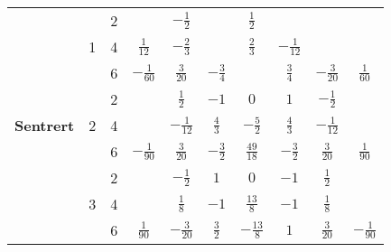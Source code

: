 \begin{table}[H]
\begin{tabular}{|c|c|c|c|c|c|c|c|c|c|}
        \multirow{12}{*}{\textbf{\footnotesize{Sentrert}}}
                                                          & \multirow{3}{*}{1}           & 2                           &                  & $-\frac{1}{2}$   &                 & $\frac{1}{2}$    &                   &                    &                  \\ \cline{3-10}
                                                          &                              & 4                           & $\frac{1}{12}$   & $-\frac{2}{3}$   &                 & $\frac{2}{3}$    & $-\frac{1}{12}$   &                    &                  \\ \cline{3-10}
                                                          &                              & 6                           & $-\frac{1}{60}$  & $\frac{3}{20}$   & $-\frac{3}{4}$  &                  & $\frac{3}{4}$     & $-\frac{3}{20}$    & $\frac{1}{60}$   \\ \cline{2-10}
                                                          & \multirow{3}{*}{2}           & 2                           &                  & $\frac{1}{2}$    & $-1$            & $0$              & $1$               & $-\frac{1}{2}$     &                  \\ \cline{3-10}
                                                          &                              & 4                           &                  & $-\frac{1}{12}$  & $\frac{4}{3}$   & $-\frac{5}{2}$   & $\frac{4}{3}$     & $-\frac{1}{12}$    &                  \\ \cline{3-10}
                                                          &                              & 6                           & $-\frac{1}{90}$  & $\frac{3}{20}$   & $-\frac{3}{2}$  & $\frac{49}{18}$  & $-\frac{3}{2}$    & $\frac{3}{20}$     & $\frac{1}{90}$   \\ \cline{2-10}
                                                          & \multirow{3}{*}{3}           & 2                           &                  & $-\frac{1}{2}$   & $1$             & $0$              & $-1$              & $\frac{1}{2}$      &                  \\ \cline{3-10}
                                                          &                              & 4                           &                  & $\frac{1}{8}$    & $-1$            & $\frac{13}{8}$   & $-1$              & $\frac{1}{8}$      &                  \\ \cline{3-10}
                                                          &                              & 6                           & $\frac{1}{90}$   & $-\frac{3}{20}$  & $\frac{3}{2}$   & $-\frac{13}{8}$  & $1$               & $\frac{3}{20}$     & $-\frac{1}{90}$  \\ \cline{2-10}

\end{tabular}
\end{table}
